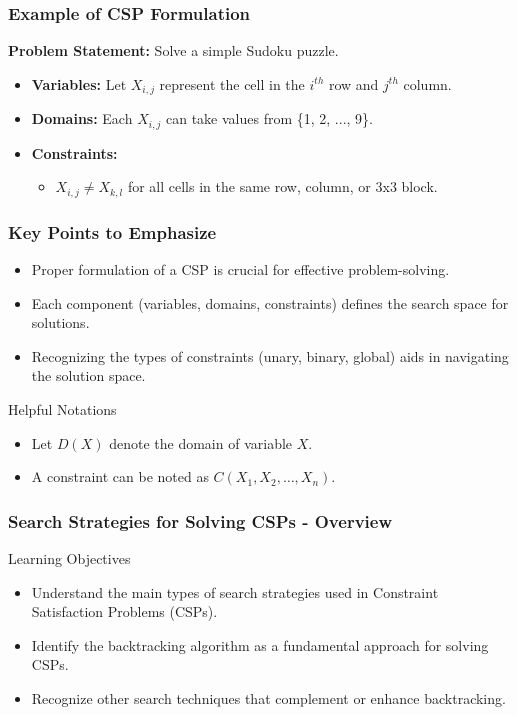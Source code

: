 \documentclass[aspectratio=169]{beamer}
\begin{document}
\begin{frame}[fragile]
    \frametitle{Example of CSP Formulation}
    \textbf{Problem Statement:} Solve a simple Sudoku puzzle.
    \begin{itemize}
        \item \textbf{Variables:} Let \(X_{i,j}\) represent the cell in the \(i^{th}\) row and \(j^{th}\) column.
        \item \textbf{Domains:} Each \(X_{i,j}\) can take values from \{1, 2, ..., 9\}.
        \item \textbf{Constraints:} 
            \begin{itemize}
                \item \(X_{i,j} \neq X_{k,l}\) for all cells in the same row, column, or 3x3 block.
            \end{itemize}
    \end{itemize}
\end{frame}

\begin{frame}[fragile]
    \frametitle{Key Points to Emphasize}
    \begin{itemize}
        \item Proper formulation of a CSP is crucial for effective problem-solving.
        \item Each component (variables, domains, constraints) defines the search space for solutions.
        \item Recognizing the types of constraints (unary, binary, global) aids in navigating the solution space.
    \end{itemize}

    \begin{block}{Helpful Notations}
        \begin{itemize}
            \item Let \(D(X)\) denote the domain of variable \(X\).
            \item A constraint can be noted as \(C(X_1, X_2, \ldots, X_n)\).
        \end{itemize}
    \end{block}
\end{frame}

\begin{frame}[fragile]
    \frametitle{Search Strategies for Solving CSPs - Overview}
    \begin{block}{Learning Objectives}
        \begin{itemize}
            \item Understand the main types of search strategies used in Constraint Satisfaction Problems (CSPs).
            \item Identify the backtracking algorithm as a fundamental approach for solving CSPs.
            \item Recognize other search techniques that complement or enhance backtracking.
        \end{itemize}
    \end{block}
\end{frame}
\end{document}
